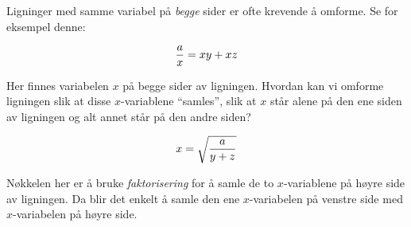 

Ligninger med samme variabel på {\it begge} sider er ofte krevende å omforme. Se for eksempel denne:

$${a \over x} = xy + xz$$

Her finnes variabelen $x$ på begge sider av ligningen. Hvordan kan vi omforme ligningen slik at disse $x$-variablene ``samles'', slik at $x$ står alene på den ene siden av ligningen og alt annet står på den andre siden?







$$x = \sqrt{{a \over y + z}}$$







Nøkkelen her er å bruke {\it faktorisering} for å samle de to $x$-variablene på høyre side av ligningen. Da blir det enkelt å samle den ene $x$-variabelen på venstre side med $x$-variabelen på høyre side.



